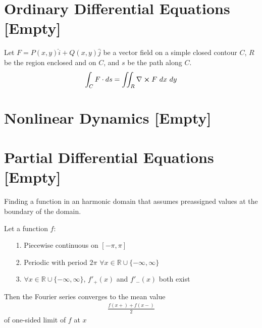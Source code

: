 \documentclass[12pt, english]{book}
\begin{document}
	
	
	
	
	
	
	
	
	
	
	
	
	
	
	
	
	
	
	
	
	\part{Ordinary Differential Equations [Empty]} \label{Ordinary Differential Equations Part}
	
	\begin{theorem}
		\label{Green's Theorem - ODE}
		Let \(F = P(x,y) \hat{i} + Q(x,y) \hat{j}\) be a vector field on a simple closed contour \(C\), \(R\) be the region enclosed and on \(C\), and \(s\) be the path along \(C\).
		\begin{align*}
			\int_C F \cdot ds = \iint_R \nabla \cross F \ dx \ dy
		\end{align*}
	\end{theorem}
	
	\part{Nonlinear Dynamics [Empty]} \label{Nonlinear Dynamics Part}
	
	
	\part{Partial Differential Equations [Empty]} \label{Partial Differential Equations Part}
	
	\begin{definition}
		\label{Dirichlet Problem Definition - Partial}
		Finding a function in an harmonic domain that assumes preassigned values at the boundary of the domain.
	\end{definition}
	
	\begin{theorem}
		\label{Fourier Theorem - PDE}
		Let a function \(f\):
		\begin{itemize}
			\item[1.] Piecewise continuous on \([-\pi,\pi]\)
			\item[2.] Periodic with period \(2\pi\) \(\forall x \in \mathbb{R} \cup \{-\infty,\infty\}\)
			\item[3.] \(\forall x \in \mathbb{R} \cup \{-\infty,\infty\}\), \(f'_{+}(x)\) and \(f'_{-}(x)\) both exist 
		\end{itemize}
		Then the Fourier series converges to the mean value
		\begin{align*}
			\frac{f(x+) + f(x-)}{2}
		\end{align*}
		of one-sided limit of \(f\) at \(x\)
	\end{theorem}
	
\end{document}
